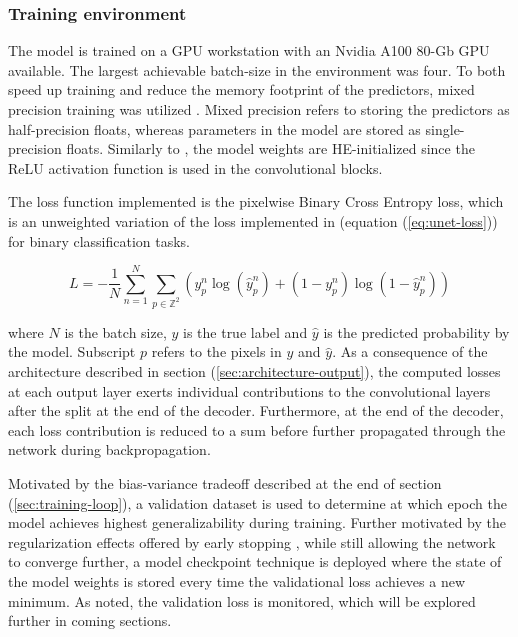 \documentclass[../main/thesis]{subfiles}
\begin{document}

\subsubsection{Training environment}
\label{sec:train_env}
The model is trained on a GPU workstation with an Nvidia A100 80-Gb GPU available. The largest achievable batch-size in the environment was four. To both speed up training and reduce the memory footprint of the predictors, mixed precision training was utilized \citep{Micikevicius2017}. Mixed precision refers to storing the predictors as half-precision floats, whereas parameters in the model are stored as single-precision floats. Similarly to \citet{Ronneberger2015}, the model weights are HE-initialized \citep{He2015} since the ReLU activation function \citep{Nair2010} is used in the convolutional blocks.

The loss function implemented is the pixelwise Binary Cross Entropy loss, which is an unweighted variation of the loss implemented in \citep{Ronneberger2015} (equation (\ref{eq:unet-loss})) for binary classification tasks. 

\begin{equation}
    \label{eq:loss}
    L = -\frac{1}{N}\sum_{n = 1}^N\sum_{p \in \mathbb{Z}^2}\left(y_p^n\log{(\hat{y}_p^n)} + \left(1 - y_p^n\right)\log{(1 - \hat{y}_p^n)}\right)
\end{equation}

where $N$ is the batch size, $y$ is the true label and $\hat{y}$ is the predicted probability by the model. Subscript $p$ refers to the pixels in $y$ and $\hat{y}$. As a consequence of the architecture described in section (\ref{sec:architecture-output}), the computed losses at each output layer exerts individual contributions to the convolutional layers after the split at the end of the decoder. Furthermore, at the end of the decoder, each loss contribution is reduced to a sum before further propagated through the network during backpropagation.

Motivated by the bias-variance tradeoff described at the end of section (\ref{sec:training-loop}), a validation dataset is used to determine at which epoch the model achieves highest generalizability during training. Further motivated by the regularization effects offered by early stopping \citep{Graves2013}, while still allowing the network to converge further, a model checkpoint technique is deployed where the state of the model weights is stored every time the validational loss achieves a new minimum. As noted, the validation loss is monitored, which will be explored further in coming sections.
\end{document}
